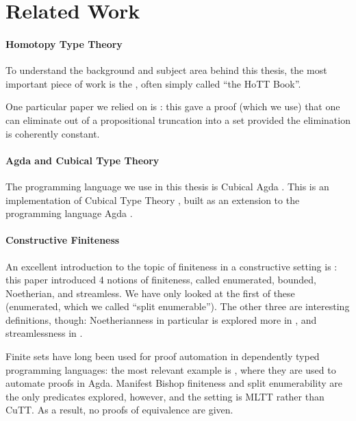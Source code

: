 \section{Related Work}
\paragraph{Homotopy Type Theory}
To understand the background and subject area behind this thesis, the most
important piece of work is the \citet{hottbook}, often simply called ``the HoTT
Book''.

One particular paper we relied on is \citet{krausGeneralUniversalProperty2015}:
this gave a proof (which we use) that one can eliminate out of a propositional
truncation into a set provided the elimination is coherently constant.
\paragraph{Agda and Cubical Type Theory}
The programming language we use in this thesis is Cubical Agda
\citep{vezzosiCubicalAgdaDependently2019}.
This is an implementation of Cubical Type Theory
\citep{cohenCubicalTypeTheory2016}, built as an extension to the programming
language Agda \citep{norellDependentlyTypedProgramming2008}.
\paragraph{Constructive Finiteness}
An excellent introduction to the topic of finiteness in a constructive setting
is \citet{coquandConstructivelyFinite2010}: this paper introduced 4 notions of
finiteness, called enumerated, bounded, Noetherian, and streamless.
We have only looked at the first of these (enumerated, which we called ``split
enumerable'').
The other three are interesting definitions, though: Noetherianness in
particular is explored more in \citet{firsovVariationsNoetherianness2016}, and
streamlessness in \citet{parmannInvestigatingStreamlessSets2015}.

Finite sets have long been used for proof automation in dependently typed
programming languages: the most relevant example is
\citet{firsovDependentlyTypedProgramming2015}, where they are used to automate
proofs in Agda.
Manifest Bishop finiteness and split enumerability are the only predicates
explored, however, and the setting is MLTT rather than CuTT.
As a result, no proofs of equivalence are given.


